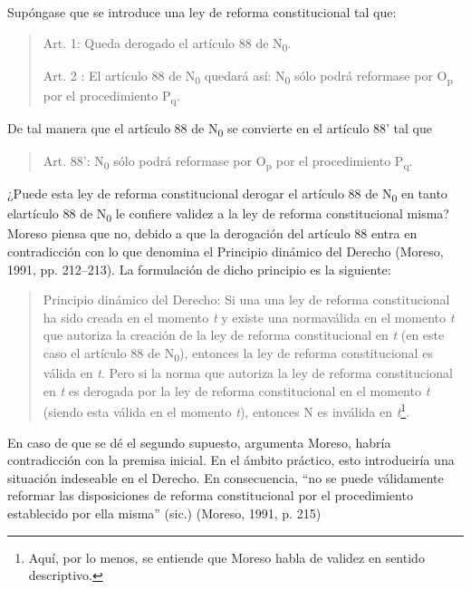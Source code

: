 \documentclass[]{book}
\begin{document}
Supóngase que se introduce una ley de reforma constitucional tal que:

\begin{quote}
Art. 1: Queda derogado el artículo 88 de N\textsubscript{0}.

Art. 2 : El artículo 88 de N\textsubscript{0} quedará así:
N\textsubscript{0} sólo podrá reformase por O\textsubscript{p} por el
procedimiento P\textsubscript{q}.
\end{quote}

De tal manera que el artículo 88 de N\textsubscript{0} se convierte en
el artículo 88' tal que

\begin{quote}
Art. 88': N\textsubscript{0} sólo podrá reformase por O\textsubscript{p}
por el procedimiento P\textsubscript{q}.
\end{quote}

¿Puede esta ley de reforma constitucional derogar el artículo 88 de N\textsubscript{0} en tanto elartículo 88 de N\textsubscript{0} le confiere validez a la ley de reforma constitucional misma? Moreso piensa que no, debido a que la derogación del artículo 88 entra en contradicción con lo que denomina el Principio dinámico del Derecho (Moreso, 1991, pp. 212--213). La formulación de dicho principio es
la siguiente:

\begin{quote}
Principio dinámico del Derecho: Si una una ley de reforma constitucional ha sido creada en el momento \emph{t} y existe una normaválida en el momento \emph{t} que autoriza la creación de la ley de reforma constitucional en \emph{t}
(en este caso el artículo 88 de N\textsubscript{0}), entonces la ley de reforma constitucional es
válida en \emph{t}. Pero si la norma que autoriza la ley de reforma constitucional en \emph{t} es
derogada por la ley de reforma constitucional en el momento \emph{t} (siendo esta válida en el momento
\emph{t}), entonces N es inválida en \emph{t}\footnote{Aquí, por lo
  menos, se entiende que Moreso habla de validez en sentido descriptivo.}.
\end{quote}

En caso de que se dé el segundo supuesto, argumenta Moreso, habría
contradicción con la premisa inicial. En el ámbito práctico, esto
introduciría una situación indeseable en el Derecho. En consecuencia,
``no se puede válidamente reformar las disposiciones de reforma
constitucional por el procedimiento establecido por ella misma'' (sic.)
(Moreso, 1991, p. 215)
\end{document}
